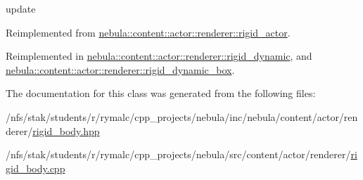 update 

Reimplemented from \hyperlink{classnebula_1_1content_1_1actor_1_1renderer_1_1rigid__actor_a650ae9b6164016a9180817d7b077326f}{nebula::content::actor::renderer::rigid\_\-actor}.

Reimplemented in \hyperlink{classnebula_1_1content_1_1actor_1_1renderer_1_1rigid__dynamic_a53122ec3edecc185ebe31a8bb38be920}{nebula::content::actor::renderer::rigid\_\-dynamic}, and \hyperlink{classnebula_1_1content_1_1actor_1_1renderer_1_1rigid__dynamic__box_af93072ba126df030c9eb4ec7d2898104}{nebula::content::actor::renderer::rigid\_\-dynamic\_\-box}.

The documentation for this class was generated from the following files:\begin{DoxyCompactItemize}
\item 
/nfs/stak/students/r/rymalc/cpp\_\-projects/nebula/inc/nebula/content/actor/renderer/\hyperlink{renderer_2rigid__body_8hpp}{rigid\_\-body.hpp}\item 
/nfs/stak/students/r/rymalc/cpp\_\-projects/nebula/src/content/actor/renderer/\hyperlink{renderer_2rigid__body_8cpp}{rigid\_\-body.cpp}\end{DoxyCompactItemize}
